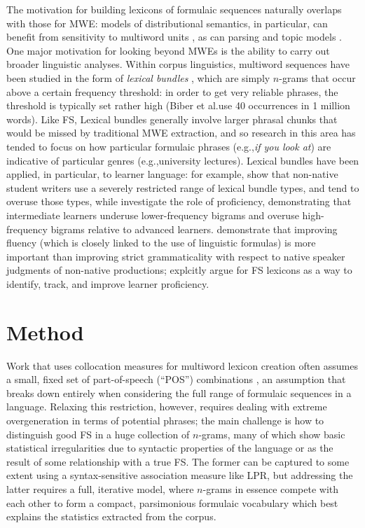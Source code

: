 \documentclass[11pt,letterpaper]{article}
\makeatletter
\def \eg {e.g.,\@ }
\def \al {al.\@ }
\makeatother
\begin{document}
The motivation for building lexicons of formulaic sequences naturally overlaps with those for MWE: models of distributional semantics, in particular, can benefit from sensitivity to multiword units \cite{Cohen:Widdows:2009}, as can parsing \cite{Constant16} and topic models \cite{Lau+:2012b}. One major motivation for looking beyond MWEs is the ability to carry out broader linguistic analyses. Within corpus linguistics, multiword sequences have been studied in the form of \textit{lexical bundles} \cite{Biber04}, which are simply $n$-grams that occur above a certain frequency threshold: in order to get very reliable phrases, the threshold is typically set rather high (Biber et \al use 40 occurrences in 1 million words). Like FS, Lexical bundles generally involve larger phrasal chunks that would be missed by traditional MWE extraction, and so research in this area has tended to focus on how particular formulaic phrases (\eg \textit{if you look at}) are indicative of particular genres (\eg university lectures). Lexical bundles have been applied, in particular, to learner language: for example,   show that non-native student writers use a severely restricted range of lexical bundle types, and tend to overuse those types, while  investigate the role of proficiency, demonstrating that intermediate learners underuse lower-frequency bigrams and overuse high-frequency bigrams relative to advanced learners.  demonstrate that improving fluency (which is closely linked to the use of linguistic formulas) is more important than improving strict grammaticality with respect to native speaker judgments of non-native productions;  explcitly argue for FS lexicons as a way to identify, track, and improve learner proficiency.




\section{Method}

Work that uses collocation measures for multiword lexicon creation often assumes a small, fixed set of part-of-speech (``POS'') combinations \cite{Evert:Krenn:2001,Pecina10}, an assumption that breaks down entirely when considering the full range of formulaic sequences in a language. Relaxing this restriction, however, requires dealing with extreme overgeneration in terms of potential phrases; the main challenge is how to distinguish good FS in a huge collection of $n$-grams, many of which show basic statistical irregularities due to syntactic properties of the language or as the result of some relationship with a true FS. The former can be captured to some extent using a syntax-sensitive association measure like LPR, but addressing the latter requires a full, iterative model, where $n$-grams in essence compete with each other to form a compact, parsimonious formulaic vocabulary which best explains the statistics extracted from the corpus.
\end{document}
